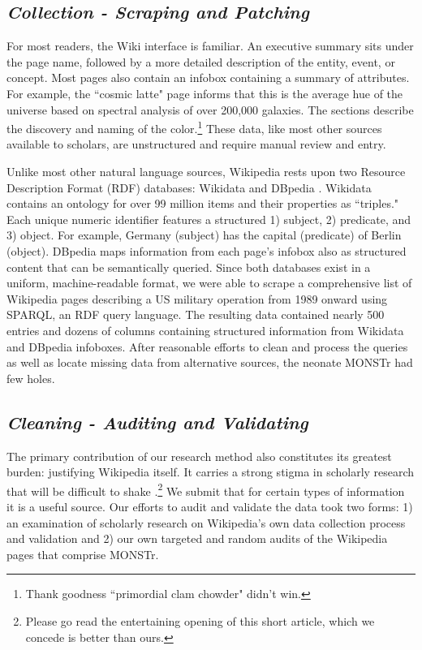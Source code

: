 \documentclass[fleqn,12pt]{article}
\begin{document}
\subsection*{\textit{Collection - Scraping and Patching}}
For most readers, the Wiki interface is familiar. An executive summary sits under the page name, followed by a more detailed description of the entity, event, or concept. Most pages also contain an infobox containing a summary of attributes. For example, the ``cosmic latte" page informs that this is the average hue of the universe based on spectral analysis of over 200,000 galaxies. The sections describe the discovery and naming of the color.\footnote{Thank goodness ``primordial clam chowder" didn't win.} These data, like most other sources available to scholars, are unstructured and require manual review and entry.

Unlike most other natural language sources, Wikipedia rests upon two Resource Description Format (RDF) databases: Wikidata and DBpedia \citep{malyshev_gettingmostout_2018}. Wikidata contains an ontology for over 99 million items and their properties as ``triples." Each unique numeric identifier features a structured 1) subject, 2) predicate, and 3) object. For example, Germany (subject) has the capital (predicate) of Berlin (object). DBpedia maps information from each page's infobox also as structured content that can be semantically queried. Since both databases exist in a uniform, machine-readable format, we were able to scrape a comprehensive list of Wikipedia pages describing a US military operation from 1989 onward using SPARQL, an RDF query language. The resulting data contained nearly 500 entries and dozens of columns containing structured information from Wikidata and DBpedia infoboxes. After reasonable efforts to clean and process the queries as well as locate missing data from alternative sources, the neonate MONSTr had few holes.

\subsection*{\textit{Cleaning - Auditing and Validating}}
The primary contribution of our research method also constitutes its greatest burden: justifying Wikipedia itself. It carries a strong stigma in scholarly research that will be difficult to shake \citep{becker_researchfauxpas_2015}.\footnote{Please go read the entertaining opening of this short article, which we concede is better than ours.} We submit that for certain types of information it is a useful source. Our efforts to audit and validate the data took two forms: 1) an examination of scholarly research on Wikipedia's own data collection process and validation and 2) our own targeted and random audits of the Wikipedia pages that comprise MONSTr.
\end{document}
